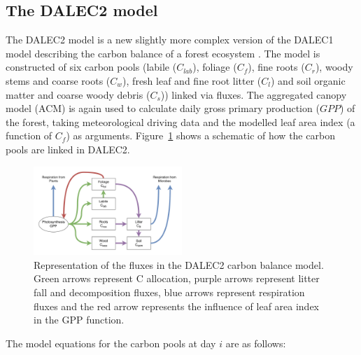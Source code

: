 \subsection{The DALEC2 model} \label{chap5:sec:dalec2}

The DALEC2 model is a new slightly more complex version of the DALEC1 model describing the carbon balance of a forest ecosystem \citep{Bloom2015}. The model is constructed of six carbon pools (labile ($C_{lab}$), foliage ($C_f$), fine roots ($C_r$), woody stems and coarse roots ($C_w$), fresh leaf and fine root litter ($C_l$) and soil organic matter and coarse woody debris ($C_s$)) linked via fluxes. The aggregated canopy model (ACM) \citep{williams1997predicting} is again used to calculate daily gross primary production ($GPP$) of the forest, taking meteorological driving data and the modelled leaf area index (a function of $C_f$) as arguments. Figure~\ref{fig:DALEC_mod} shows a schematic of how the carbon pools are linked in DALEC2.   

\begin{figure}[ht]
    \centering
    \includegraphics[width=0.5\textwidth]{chapter/chapter5/dalec2diag.pdf}
    \caption{Representation of the fluxes in the DALEC2 carbon balance model. Green arrows represent C allocation, purple arrows represent litter fall and decomposition fluxes, blue arrows represent respiration fluxes and the red arrow represents the influence of leaf area index in the GPP function.} \label{fig:DALEC_mod}
\end{figure}

The model equations for the carbon pools at day $i$ are as follows:

